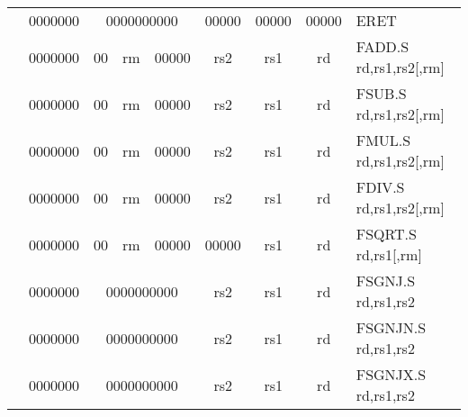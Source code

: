 \begin{table}[p]
\begin{small}
\begin{center}
\begin{tabular}{rcccccccccl}
&
\multicolumn{1}{|c|}{0000000} &
\multicolumn{5}{c|}{0000000000} &
\multicolumn{1}{c|}{00000} &
\multicolumn{1}{c|}{00000} &
\multicolumn{1}{c|}{00000} & ERET  \\
\cline{2-10}
  

&
\multicolumn{1}{|c|}{0000000} &
\multicolumn{1}{c|}{00} &
\multicolumn{2}{c|}{rm} &
\multicolumn{2}{c|}{00000} &
\multicolumn{1}{c|}{rs2} &
\multicolumn{1}{c|}{rs1} &
\multicolumn{1}{c|}{rd} & FADD.S rd,rs1,rs2[,rm] \\
\cline{2-10}
  

&
\multicolumn{1}{|c|}{0000000} &
\multicolumn{1}{c|}{00} &
\multicolumn{2}{c|}{rm} &
\multicolumn{2}{c|}{00000} &
\multicolumn{1}{c|}{rs2} &
\multicolumn{1}{c|}{rs1} &
\multicolumn{1}{c|}{rd} & FSUB.S rd,rs1,rs2[,rm] \\
\cline{2-10}
  

&
\multicolumn{1}{|c|}{0000000} &
\multicolumn{1}{c|}{00} &
\multicolumn{2}{c|}{rm} &
\multicolumn{2}{c|}{00000} &
\multicolumn{1}{c|}{rs2} &
\multicolumn{1}{c|}{rs1} &
\multicolumn{1}{c|}{rd} & FMUL.S rd,rs1,rs2[,rm] \\
\cline{2-10}
  

&
\multicolumn{1}{|c|}{0000000} &
\multicolumn{1}{c|}{00} &
\multicolumn{2}{c|}{rm} &
\multicolumn{2}{c|}{00000} &
\multicolumn{1}{c|}{rs2} &
\multicolumn{1}{c|}{rs1} &
\multicolumn{1}{c|}{rd} & FDIV.S rd,rs1,rs2[,rm] \\
\cline{2-10}
  

&
\multicolumn{1}{|c|}{0000000} &
\multicolumn{1}{c|}{00} &
\multicolumn{2}{c|}{rm} &
\multicolumn{2}{c|}{00000} &
\multicolumn{1}{c|}{00000} &
\multicolumn{1}{c|}{rs1} &
\multicolumn{1}{c|}{rd} & FSQRT.S rd,rs1[,rm] \\
\cline{2-10}
  

&
\multicolumn{1}{|c|}{0000000} &
\multicolumn{5}{c|}{0000000000} &
\multicolumn{1}{c|}{rs2} &
\multicolumn{1}{c|}{rs1} &
\multicolumn{1}{c|}{rd} & FSGNJ.S rd,rs1,rs2 \\
\cline{2-10}
  

&
\multicolumn{1}{|c|}{0000000} &
\multicolumn{5}{c|}{0000000000} &
\multicolumn{1}{c|}{rs2} &
\multicolumn{1}{c|}{rs1} &
\multicolumn{1}{c|}{rd} & FSGNJN.S rd,rs1,rs2 \\
\cline{2-10}
  

&
\multicolumn{1}{|c|}{0000000} &
\multicolumn{5}{c|}{0000000000} &
\multicolumn{1}{c|}{rs2} &
\multicolumn{1}{c|}{rs1} &
\multicolumn{1}{c|}{rd} & FSGNJX.S rd,rs1,rs2 \\
\cline{2-10}
  


\end{tabular}
\end{center}
\end{small}
\end{table}
